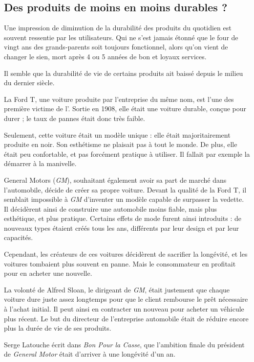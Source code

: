 \subsection{Des produits de moins en moins durables ?}

Une impression de diminution de la durabilité des produits du quotidien est souvent ressentie par les utilisateurs. Qui ne s'est jamais étonné que le four de vingt ans des grands-parents soit toujours fonctionnel, alors qu'on vient de changer le sien, mort après 4 ou 5 années de bon et loyaux services. 

Il semble que la durabilité de vie de certains produits ait baissé depuis le milieu du dernier siècle. 

\bigbreak
La Ford T, une voiture produite par l'entreprise du même nom, est l'une des première victime de l'\op. Sortie en 1908, elle était une voiture durable, conçue pour durer ; le taux de pannes était donc très faible.   


Seulement, cette voiture était un modèle unique : elle était majoritairement produite en noir. Son esthétisme ne plaisait pas à tout le monde. De plus, elle était peu confortable, et pas forcément pratique à utiliser. Il fallait par exemple la démarrer à la manivelle. 

\label{GM}
General Motors (\textit{GM}), souhaitant également avoir sa part de marché dans l'automobile, décide de créer sa propre voiture. Devant la qualité de la Ford T, il semblait impossible à \textit{GM} d'inventer un modèle capable de surpasser la vedette. Il décidèrent ainsi de construire une automobile moins fiable, mais plus esthétique, et plus pratique. Certains effets de mode furent ainsi introduits : de nouveaux types étaient créés tous les ans, différents par leur design et par leur capacités.


Cependant, les créateurs de ces voitures décidèrent de sacrifier la longévité, et les voitures tombaient plus souvent en panne. Mais le consommateur en profitait pour en acheter une nouvelle.


La volonté de Alfred Sloan, le dirigeant de \textit{GM}, était justement que chaque voiture dure juste assez longtemps pour que le client rembourse le prêt nécessaire à l'achat initial.
Il peut ainsi en contracter un nouveau pour acheter un véhicule plus récent. Le but du directeur de l'entreprise automobile était de réduire encore plus la durée de vie de ses produits.

Serge Latouche écrit dans \textit{Bon Pour la Casse}\cite{bpc}, que l'ambition finale du président de \textit{General Motor} était d'arriver à une longévité d'un an.

